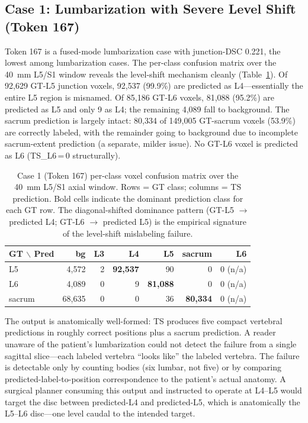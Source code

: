 \documentclass{article}
\begin{document}
\subsection{Case 1: Lumbarization with Severe Level Shift
            (Token 167)}
\label{sec:case167}

Token 167 is a fused-mode lumbarization case with junction-DSC
0.221, the lowest among lumbarization cases.
The per-class confusion matrix over the 40~mm L5/S1 window reveals
the level-shift mechanism cleanly
(Table~\ref{tab:case167_confusion}).
Of 92{,}629 GT-L5 junction voxels, 92{,}537 (99.9\%) are predicted
as L4---essentially the entire L5 region is misnamed.
Of 85{,}186 GT-L6 voxels, 81{,}088 (95.2\%) are predicted as L5
and only 9 as L4; the remaining 4{,}089 fall to background.
The sacrum prediction is largely intact: 80{,}334 of 149{,}005
GT-sacrum voxels (53.9\%) are correctly labeled, with the
remainder going to background due to incomplete sacrum-extent
prediction (a separate, milder issue).
No GT-L6 voxel is predicted as L6 (\textsc{TS\_L6}\,=\,0
structurally).

\begin{table}[t]
\caption{Case 1 (Token 167) per-class voxel confusion matrix over
the 40~mm L5/S1 axial window. Rows = GT class; columns = TS
prediction. Bold cells indicate the dominant prediction class for
each GT row. The diagonal-shifted dominance pattern (GT-L5
$\to$ predicted L4; GT-L6 $\to$ predicted L5) is the empirical
signature of the level-shift mislabeling failure.}
\label{tab:case167_confusion}
\centering
\small
\begin{tabular}{lrrrrrr}
\toprule
\bfseries GT $\backslash$ Pred & \bfseries bg & \bfseries L3 & \bfseries L4 & \bfseries L5 & \bfseries sacrum & \bfseries L6 \\
\midrule
L5     & 4{,}572  & 2 & \textbf{92{,}537} & 90              & 0           & 0 (n/a) \\
L6     & 4{,}089  & 0 & 9                 & \textbf{81{,}088} & 0         & 0 (n/a) \\
sacrum & 68{,}635 & 0 & 0                 & 36              & \textbf{80{,}334} & 0 (n/a) \\
\bottomrule
\end{tabular}
\end{table}

The output is anatomically well-formed: TS produces five compact
vertebral predictions in roughly correct positions plus a sacrum
prediction.
A reader unaware of the patient's lumbarization could not detect
the failure from a single sagittal slice---each labeled vertebra
``looks like'' the labeled vertebra.
The failure is detectable only by counting bodies (six lumbar,
not five) or by comparing predicted-label-to-position correspondence
to the patient's actual anatomy.
A surgical planner consuming this output and instructed to operate
at L4--L5 would target the disc between predicted-L4 and
predicted-L5, which is anatomically the L5--L6 disc---one level
caudal to the intended target.
\end{document}
